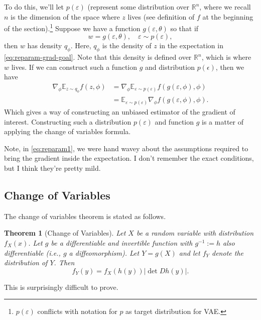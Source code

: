 \documentclass{article}
\newtheorem{theorem}{Theorem}
\newcommand{\R}{\mathbb{R}}
\newcommand{\E}{\mathbb{E}}
\newcommand{\grad}{\nabla}
\newcommand{\eps}{\varepsilon}
\begin{document}
To do this, we'll let $p(\eps)$ (represent some distribution over $\R^n$, where we recall $n$ is the dimension of the space where $z$ lives (see definition of $f$ at the beginning of the section).\footnote{$p(\eps)$ conflicts with notation for $p$ as target distribution for VAE.}
Suppose we have a function $g(\eps, \theta)$ so that if 
$$
w = g(\eps, \theta), \quad \eps \sim p(\eps),
$$
then $w$ has density $q_\phi$. Here, $q_\phi$ is the density of $z$ in the expectation in \eqref{eq:reparam-grad-goal}. Note that this density is defined over $\R^n$, which is where $w$ lives. If we can construct such a function $g$ and distribution $p(\epsilon)$, then we have
\begin{align} \label{eq:reparam1}
    \grad_\phi \E_{z\sim q_\phi} f(z, \phi) & = \grad_\phi \E_{\eps \sim p(\eps)} f(g(\eps, \phi), \phi)\\
    & = \E_{\eps \sim p(\eps)} \grad_\phi f(g(\eps, \phi), \phi).
\end{align}
Which gives a way of constructing an unbiased estimator of the gradient of interest. 
Constructing such a distribution $p(\eps)$ and function $g$ is a matter of applying the change of variables formula. 

Note, in \eqref{eq:reparam1}, we were hand wavey about the assumptions required to bring the gradient inside the expectation. I don't remember the exact conditions, but I think they're pretty mild. 


\subsection{Change of Variables}
The change of variables theorem is stated as follows. 
\begin{theorem}[Change of Variables]
    Let $X$ be a random variable with distribution $f_X(x)$. Let $g$ be a differentiable and invertible function with $g^{-1}:=h$ also differentiable (i.e., $g$ a diffeomorphism). Let $Y= g(X)$ and let $f_Y$ denote the distribution of $Y$. Then
    $$
f_Y(y) = f_X(h(y)) |\det D h(y)|.
    $$
\end{theorem}
This is surprisingly difficult to prove. 
\end{document}
